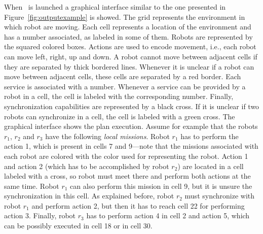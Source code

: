 
When  \toolName\ is launched a graphical interface similar to the one presented  in Figure~\ref{fig:outputexample} is showed.
The grid represents the environment in which robot are moving.
Each cell represents a location of the environment and has a number associated, as labeled in some of them.
Robots are represented by the squared colored boxes.
Actions are used to encode movement, i.e., each robot can move left, right, up and down.
A robot  cannot move between adjacent cells if they are separated by thick bordered lines.
Whenever  it is unclear if a robot can move between adjacent cells, these cells are separated by a red border.
Each service is associated with a number.
Whenever a service can be provided by a robot in a cell, the cell is labeled with the corresponding number.
Finally, synchronization capabilities are represented by a black cross.
If it is unclear if two robots can synchronize in a cell, the cell is labeled with a green cross.
The graphical interface shows the plan execution.
Assume for example that the robots $r_1$, $r_2$ and $r_3$ have the following \emph{local missions}.
Robot $r_1$ has to perform the action 1, which is present in cells 7 and 9---note that the missions associated with each robot are colored with the color used for representing the robot.
Action 1 and action 2 (which has to be accomplished by robot $r_2$) are located in a cell labeled with a cross, so robot must meet there and perform both actions at the same time.
Robot $r_1$ can also perform this mission in cell 9, but it is unsure the synchronization in this cell.
As explained before, robot $r_2$ must synchronize with robot $r_1$ and perform action 2, but then it has to reach cell 22 for performing action 3.
Finally, robot $r_3$ has to perform action 4 in cell 2 and action 5, which can be possibly executed in cell 18 or in cell 30.

